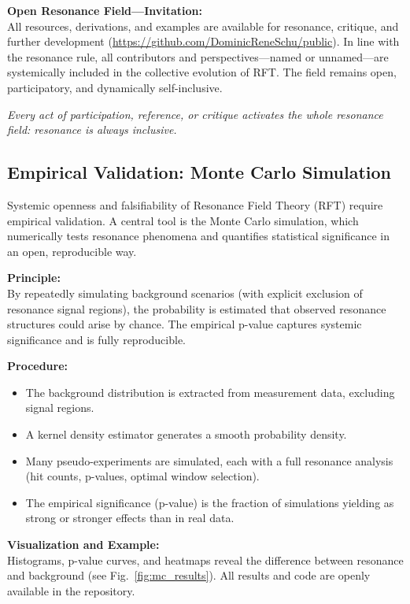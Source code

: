 \documentclass[12pt]{iopart}
\begin{document}
\medskip

\textbf{Open Resonance Field—Invitation:}\\
All resources, derivations, and examples are available for resonance, critique, and further development (\url{https://github.com/DominicReneSchu/public}). In line with the resonance rule, all contributors and perspectives—named or unnamed—are systemically included in the collective evolution of RFT. The field remains open, participatory, and dynamically self-inclusive.

\medskip

\textit{Every act of participation, reference, or critique activates the whole resonance field: resonance is always inclusive.}

\subsection{Empirical Validation: Monte Carlo Simulation}
\label{sec:monte_carlo}

Systemic openness and falsifiability of Resonance Field Theory (RFT) require empirical validation. A central tool is the Monte Carlo simulation, which numerically tests resonance phenomena and quantifies statistical significance in an open, reproducible way.

\textbf{Principle:}\\
By repeatedly simulating background scenarios (with explicit exclusion of resonance signal regions), the probability is estimated that observed resonance structures could arise by chance. The empirical p-value captures systemic significance and is fully reproducible.

\textbf{Procedure:}
\begin{itemize}
	\item The background distribution is extracted from measurement data, excluding signal regions.
	\item A kernel density estimator generates a smooth probability density.
	\item Many pseudo-experiments are simulated, each with a full resonance analysis (hit counts, p-values, optimal window selection).
	\item The empirical significance (p-value) is the fraction of simulations yielding as strong or stronger effects than in real data.
\end{itemize}

\textbf{Visualization and Example:}\\
Histograms, p-value curves, and heatmaps reveal the difference between resonance and background (see Fig.~\ref{fig:mc_results}). All results and code are openly available in the repository.
\end{document}
